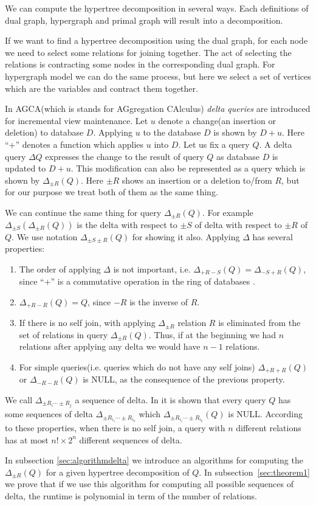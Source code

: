 \documentclass[12pt]{article}
\begin{document}
We can compute the hypertree decomposition in several ways. Each definitions of dual graph, hypergraph and primal graph will result into a decomposition.
\par
If we want to find a hypertree decomposition using the dual graph, for each node we need to select some relations for joining together. The act of selecting the relations is contracting some nodes in the corresponding dual graph. 
For hypergraph model we can do the same process, but here we select a set of vertices which are the variables and contract them together.\par

In AGCA(which is stands for AGgregation CAlculus)\cite{2} \emph{delta queries} are introduced for incremental view maintenance. 
Let $u$ denote a change(an insertion or deletion) to database $D$. Applying $u$ to the database $D$ is shown by $D+u$. Here ``+'' denotes a function which applies $u$ into $D$. Let us fix a query $Q$. A delta query $\Delta Q$ expresses the change to the result of query $Q$ as database $D$ is updated to $D+u$.  This modification can also be represented as a query which is shown by $\Delta_{\pm R}(Q)$. Here $\pm R$ shows an insertion or a deletion to/from $R$, but for our purpose we treat both of them as the same thing.

We can continue the same thing  for query $\Delta_{\pm R}(Q)$. For example $\Delta_{\pm S}(\Delta_{\pm R}(Q))$ is the delta with respect to $\pm S$ of delta with respect to $\pm R$ of $Q$. We use notation $\Delta_{\pm S\pm R}(Q)$ for showing it also. Applying $\Delta$ has several properties: 
\begin{enumerate}
\item The order of applying $\Delta$ is not important, i.e. $\Delta_{+R-S}(Q)=\Delta_{-S+R}(Q)$, since  ``+'' is a commutative operation in the ring of databases \cite{2}.
\label{delta1}
\item $\Delta_{+R-R}(Q)=Q$, since $-R$ is the inverse of $R$.
\item If there is no self join, with applying $\Delta_{\pm R}$ relation $R$ is eliminated from the set of relations in query $\Delta_{\pm R}(Q)$. Thus, if at the beginning we had $n$ relations after applying any delta we would have $n-1$ relations.
\item For simple queries(i.e. queries which do not have any self joins) $\Delta_{+R+R}(Q)$ or $\Delta_{-R-R}(Q)$ is NULL, as the consequence of the previous property. 
\end{enumerate}
We call $\Delta_{\pm R_{i}\cdots\pm R_{j}}$ a sequence of delta. 
In \cite{2} it is shown that every query $Q$ has some sequences of delta $\Delta_{\pm R_{i_{1}}\cdots\pm R_{i_{k}}}$ which $\Delta_{\pm R_{i_{1}}\cdots\pm R_{i_{k}}}(Q)$ is NULL.
According to these properties, when there is no self join, a query with $n$ different relations has at most $n!\times 2^{n}$ different sequences of delta. \\\par
In subsection \ref{sec:algorithmdelta} we introduce an algorithms for computing the $\Delta_{\pm R}(Q)$ for a given hypertree decomposition of $Q$. In subsection~\ref{sec:theorem1} we prove that if we use this algorithm for computing all possible sequences of delta, the runtime is polynomial in term of the number of relations. 
\end{document}

